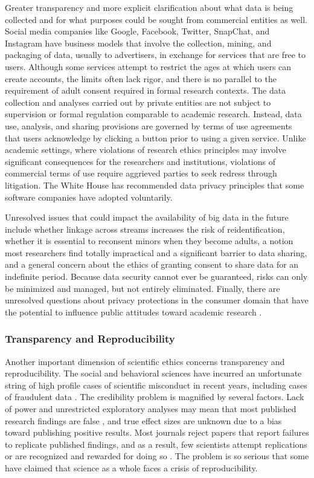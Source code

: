 \documentclass[letterpaper,man,apacite,natbib]{apa6}
\begin{document}
Greater transparency and more explicit clarification about what data is being collected and for what purposes could be sought from commercial entities as well.
Social media companies like Google, Facebook, Twitter, SnapChat, and Instagram have business models that involve the collection, mining, and packaging of data, usually to advertisers, in exchange for services that are free to users.
Although some services attempt to restrict the ages at which users can create accounts, the limits often lack rigor, and there is no parallel to the requirement of adult consent required in formal research contexts.
The data collection and analyses carried out by private entities are not subject to supervision or formal regulation comparable to academic research.
Instead, data use, analysis, and sharing provisions are governed by terms of use agreements that users acknowledge by clicking a button prior to using a given service.
Unlike academic settings, where violations of research ethics principles may involve significant consequences for the researchers and institutions, violations of commercial terms of use require aggrieved parties to seek redress through litigation.
The White House has recommended data privacy principles \cite{data-privacy-networked-world} that some software companies have adopted voluntarily.

Unresolved issues that could impact the availability of big data in the future include whether linkage across streams increases the risk of reidentification, whether it is essential to reconsent minors when they become adults, a notion most researchers find totally impractical and a significant barrier to data sharing, and a general concern about the ethics of granting consent to share data for an indefinite period.
Because data security cannot ever be guaranteed, risks can only be minimized and managed, but not entirely eliminated. 
Finally, there are unresolved questions about privacy protections in the consumer domain that have the potential to influence public attitudes toward academic research \cite{meyer_everything_2014}.
\subsubsection{Transparency and Reproducibility}
Another important dimension of scientific ethics concerns transparency and reproducibility.
The social and behavioral sciences have incurred an unfortunate string of high profile cases of scientific misconduct in recent years, including cases of fraudulent data \cite{singal_case_2015, bhattacharjee_diederik_2013}.
The credibility problem is magnified by several factors.
Lack of power and unrestricted exploratory analyses may mean that most published research findings are false \cite{ioannidis_why_2005}, and true effect sizes are unknown due to a bias toward publishing positive results.
Most journals reject papers that report failures to replicate published findings, and as a result, few scientists attempt replications or are recognized and rewarded for doing so \cite{nosek_scientific_2012}.
The problem is so serious that some have claimed that science as a whole faces a crisis of reproducibility.
\end{document}
